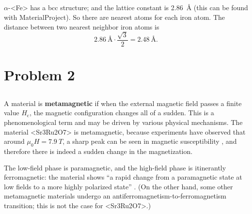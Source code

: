 \documentclass[hyperref, a4paper]{article}
\newcommand*{\concept}[1]{{\textbf{#1}}}
\def\ce#1{<#1>}%
\begin{document}
\subsection{}

$\alpha$-\ce{Fe} has a bcc structure;
and the lattice constant is \SI{2.86}{\angstrom}
(this can be found with MaterialProject).
So there are nearest atoms for each iron atom.
The distance between two nearest neighbor iron atoms
is 
\[
    \SI{2.86}{\angstrom} \cdot \frac{\sqrt{3}}{2} = \SI{2.48}{\angstrom}.
\]

\subsection{}

\subsection{}



\section{Problem 2}

\subsection{}

A material is \concept{metamagnetic} if 
when the external magnetic field passes a finite value $H_{\text{c}}$,
the magnetic configuration changes all of a sudden.
This is a phenomenological term 
and may be driven by various physical mechanisms.
The material \ce{Sr3Ru2O7} is metamagnetic, 
because experiments have observed that 
around $\mu_0 H = \SI{7.9}{T}$, 
a sharp peak can be seen in magnetic susceptibility
\cite{grigera2004disorder},
and therefore there is indeed a sudden change in the magnetization.

The low-field phase is paramagnetic, 
and the high-field phase is itinerantly ferromagnetic:
the material shows 
``a rapid change from a paramagnetic state at low fields to
a more highly polarized state'' \cite{perry2001metamagnetism}.
(On the other hand, some other metamagnetic materials 
undergo an antiferromagnetism-to-ferromagnetism transition;
this is not the case for \ce{Sr3Ru2O7}.)
\end{document}

